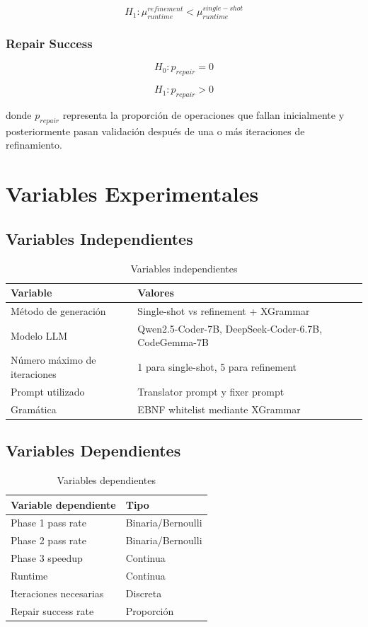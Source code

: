 \documentclass[12pt]{article}
\begin{document}
\[
H_1 : \mu_{runtime}^{refinement} < \mu_{runtime}^{single-shot}
\]

\subsubsection*{Repair Success}

\[
H_0 : p_{repair} = 0
\]

\[
H_1 : p_{repair} > 0
\]

donde $p_{repair}$ representa la proporción de operaciones que fallan inicialmente y posteriormente pasan validación después de una o más iteraciones de refinamiento.

\section{Variables Experimentales}

\subsection{Variables Independientes}

\begin{table}[H]
\centering
\begin{tabular}{p{} p{}}
\toprule
\textbf{Variable} & \textbf{Valores} \\
\midrule
Método de generación & Single-shot vs refinement + XGrammar \\
Modelo LLM & Qwen2.5-Coder-7B, DeepSeek-Coder-6.7B, CodeGemma-7B \\
Número máximo de iteraciones & 1 para single-shot, 5 para refinement \\
Prompt utilizado & Translator prompt y fixer prompt \\
Gramática & EBNF whitelist mediante XGrammar \\
\bottomrule
\end{tabular}
\caption{Variables independientes}
\end{table}

\subsection{Variables Dependientes}

\begin{table}[H]
\centering
\begin{tabular}{p{} p{}}
\toprule
\textbf{Variable dependiente} & \textbf{Tipo} \\
\midrule
Phase 1 pass rate & Binaria/Bernoulli \\
Phase 2 pass rate & Binaria/Bernoulli \\
Phase 3 speedup & Continua \\
Runtime & Continua \\
Iteraciones necesarias & Discreta \\
Repair success rate & Proporción \\
\bottomrule
\end{tabular}
\caption{Variables dependientes}
\end{table}
\end{document}
